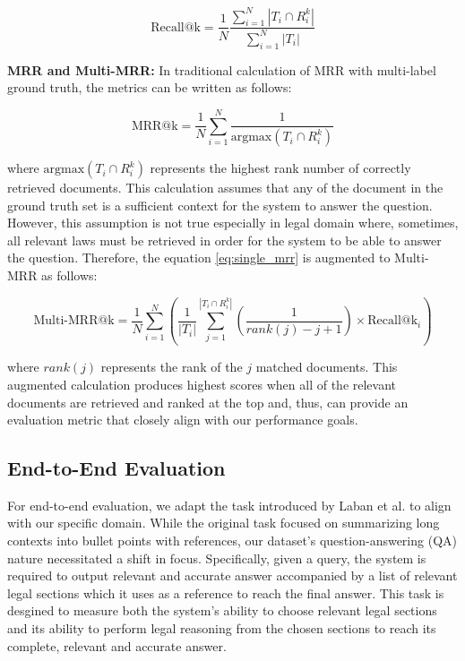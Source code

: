 \begin{equation}
    \text{Recall@k}=\frac{1}{N}\frac{\sum_{i=1}^N |T_i\cap R_i^k|}{\sum_{i=1}^N |T_i|}
\end{equation}

\textbf{MRR and Multi-MRR: }In traditional calculation of MRR with multi-label ground truth, the metrics can be written as follows:

\begin{equation}
    \text{MRR@k} = \frac{1}{N}\sum_{i=1}^N \frac{1}{\text{argmax}(T_i \cap R_i^k)} \label{eq:single_mrr}
\end{equation}

where $\text{argmax}(T_i\cap R_i^k)$ represents the highest rank number of correctly retrieved documents. This calculation assumes that any of the document in the ground truth set is a sufficient context for the system to answer the question. However, this assumption is not true especially in legal domain where, sometimes, all relevant laws must be retrieved in order for the system to be able to answer the question. Therefore, the equation \ref{eq:single_mrr} is augmented to Multi-MRR as follows:

\begin{equation}
    \text{Multi-MRR@k}=\frac{1}{N}\sum_{i=1}^N(\frac{1}{|T_i|}\sum_{j=1}^{|T_i\cap R_i^k|}(\frac{1}{rank(j) - j + 1})\times \text{Recall@k}_{i})
\end{equation}

where $rank(j)$ represents the rank of the $j$ matched documents. This augmented calculation produces highest scores when all of the relevant documents are retrieved and ranked at the top and, thus, can provide an evaluation metric that closely align with our performance goals.


\subsection{End-to-End Evaluation}
\label{subsec:e2e}

For end-to-end evaluation, we adapt the task introduced by Laban et al. \cite{laban2024summaryhaystackchallengelongcontext} to align with our specific domain. While the original task focused on summarizing long contexts into bullet points with references, our dataset’s question-answering (QA) nature necessitated a shift in focus. Specifically, given a query, the system is required to output relevant and accurate answer accompanied by a list of relevant legal sections which it uses as a reference to reach the final answer. This task is desgined to measure both the system's ability to choose relevant legal sections and its ability to perform legal reasoning from the chosen sections to reach its complete, relevant and accurate answer.

